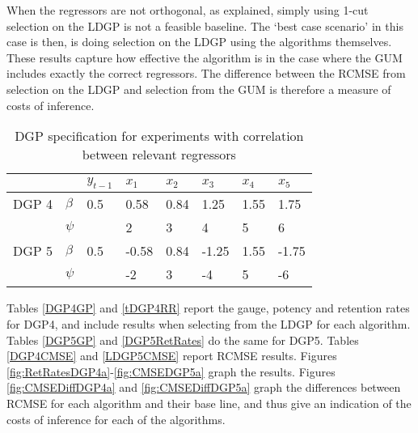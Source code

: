 \documentclass[11pt, oneside]{book}   	%
\begin{document}
When the regressors are not orthogonal, as explained, simply using 1-cut selection on the LDGP is not a feasible baseline. The `best case scenario' in this case is then, is doing selection on the LDGP using the algorithms themselves. These results capture how effective the algorithm is in the case where the GUM includes exactly the correct regressors. The difference between the RCMSE from selection on the LDGP and selection from the GUM is therefore a measure of costs of inference. 



\begin{table}[h]
\centering
\begin{tabular}{l|l|l|l|l|l|l|l}

& &$y_{t-1}$ &$x_{1}$ &$x_{2}$ &$x_{3}$ &  $x_{4}$ & $x_{5}$  \\
\hline
DGP 4 & $\beta$ & 0.5 & 0.58 &0.84 &1.25 &  1.55 & 1.75 \\

 	& $\psi$ & &2 &3 &4 &5 &6 \\
\hline
DGP 5 & $\beta$ & 0.5 & -0.58 &0.84 &-1.25 &  1.55 &-1.75 \\

 	& $\psi$ & &-2 &3 &-4 &5 &-6 \\

    
\end{tabular}
\caption{DGP specification for experiments with correlation between relevant regressors}
\label{DGPs4and5}
\end{table} 

Tables \ref{DGP4GP} and \ref{tDGP4RR} report the gauge, potency and retention rates for DGP4, and include results when selecting from the LDGP for each algorithm. Tables \ref{DGP5GP} and \ref{DGP5RetRates} do the same for DGP5. Tables \ref{DGP4CMSE} and \ref{LDGP5CMSE} report RCMSE results. Figures \ref{fig:RetRatesDGP4a}-\ref{fig:CMSEDGP5a} graph the results. Figures \ref{fig:CMSEDiffDGP4a} and \ref{fig:CMSEDiffDGP5a} graph the differences between RCMSE for each algorithm and their base line, and thus give an indication of the costs of inference for each of the algorithms.
\end{document}
